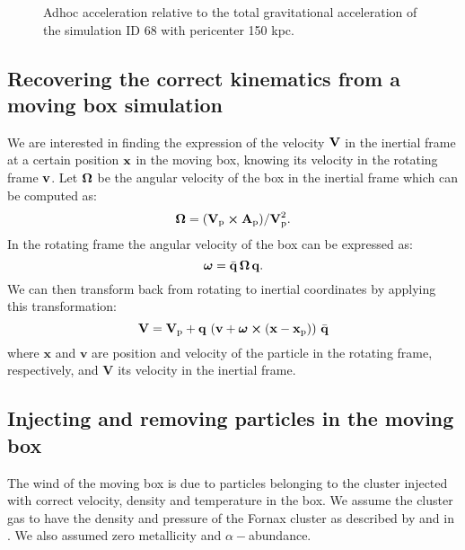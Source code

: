 \begin{figure} %
\centering
\caption{Adhoc acceleration relative to the total gravitational acceleration of the simulation ID 68 with pericenter 150 kpc.}
\label{fig:adhoc}
\end{figure}


\subsection{Recovering the correct kinematics from a moving box simulation}
\label{sec:correct_kinematics}
We are interested in finding the expression of the velocity $\boldsymbol{\mathbf{V}}$ in the inertial frame at a certain position $\boldsymbol{\mathbf{x}}$ in the moving box, knowing its velocity in the rotating frame $\boldsymbol{\mathbf{v}}$.
Let $\boldsymbol{\mathbf{\Omega}}$ be the angular velocity of the box in the inertial frame which can be computed as:
\begin{equation}
 \boldsymbol{\mathbf{\Omega}} = {(\boldsymbol{\mathbf{V}}_{\mathrm p}\cross\boldsymbol{\mathbf{A}}_{\mathrm p})}/{\boldsymbol{\mathbf{V}}_{\mathrm p}^2}.
\end{equation}
In the rotating frame the angular velocity of the box can be expressed as:
\begin{equation}
\boldsymbol{\mathbf{\omega}} = \bar{\mathbf{q}}\, \boldsymbol{\mathbf{\Omega}}\, \mathbf{q}.
\end{equation}
We can then transform back from rotating to inertial coordinates by applying this transformation:
\begin{equation}
\boldsymbol{\mathbf{V}} = \boldsymbol{\mathbf{V}}_{\mathrm p} + \mathbf{q} \, \left(\boldsymbol{\mathbf{v}} + \boldsymbol{\mathbf{\omega}} \cross (\boldsymbol{\mathbf{x}}-\boldsymbol{\mathbf{x}}_{\mathrm p})\right) \,\bar{\mathbf{q}}
\end{equation}
where $\mathbf x$ and $\mathbf v$ are position and velocity of the particle in the rotating frame, respectively, and $\mathbf V$ its velocity in the inertial frame. %

\subsection{Injecting and removing particles in the moving box}
The wind of the moving box is due to particles belonging to the cluster injected with correct velocity, density and temperature in the box.
We assume the cluster gas to have the density and pressure of the Fornax cluster as described by \citet{Paolillo2002} and in . We also assumed zero metallicity and $\alpha-$abundance.

